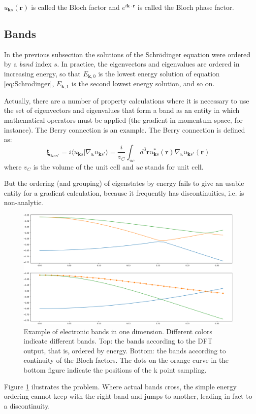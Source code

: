\documentclass[a4paper,12pt]{report}
\begin{document}
$u_{\pmb{k}s}(\pmb{r})$ is called the Bloch factor and $e^{i\pmb{k}\cdot\pmb{r}}$
is called the Bloch phase factor.


\subsection*{Bands}

In the previous subsection the solutions of the Schr\"odinger equation were ordered by a \emph{band} index $s$.
In practice, the eigenvectors and eigenvalues are ordered in increasing energy, so that $E_{\pmb{k},0}$ is
the lowest energy solution of equation \ref{eq:Schrodinger}, $E_{\pmb{k},1}$ is the second lowest energy solution,
and so on.

Actually, there are a number of property calculations where it is necessary to use the set of eigenvectors
and eigenvalues that form a band as an entity in which mathematical operators must be applied
(the gradient in momentum space, for instance).
The Berry connection is an example.
The Berry connection is defined as:
\begin{equation}\label{eq:berry}
 \pmb{\xi}_{\pmb{k}ss'} = i\langle u_{\pmb{k}s}|\nabla_{\pmb{k}} u_{\pmb{k}s'} \rangle
                          = \dfrac{i}{v_C}\int_{uc} d^3\pmb{r}u_{\pmb{k}s}^*(\pmb{r})
                          \nabla_{\pmb{k}} u_{\pmb{k}s'}(\pmb{r})
\end{equation}
where $v_C$ is the volume of the unit cell and $uc$ stands for unit cell.

But the ordering (and grouping) of eigenstates by energy fails to give an usable entity for a gradient calculation,
because it frequently has discontinuities, i.e. is non-analytic.
\begin{figure}
 \centering
 \includegraphics[scale=0.3,keepaspectratio=true]{figures/order_bands1D.png}
 \caption{Example of electronic bands in one dimension.
 Different colors indicate different bands.
 Top: the bands according to the DFT output, that is, ordered by energy.
 Bottom: the bands according to continuity of the Bloch factors.
 The dots on the orange curve in the bottom figure indicate the positions of the k point sampling.}
 \label{fig:orderbands}
\end{figure}
Figure \ref{fig:orderbands} ilustrates the problem.
Where actual bands cross, the simple energy ordering cannot keep with the right band and jumps to another,
leading in fact to a discontinuity.
\end{document}
